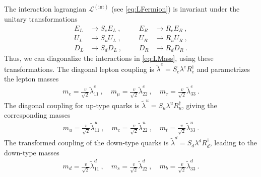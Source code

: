 The interaction lagrangian $\mathcal{L}^{(\text{int})}$ (see \eqref{eq:LFermion}) is invariant under the unitary transformations
\begin{align}
	E_L &\rightarrow S_eE_L \ , && &E_R &\rightarrow R_eE_R \ , \\
	U_L &\rightarrow S_uU_L \ , && &U_R &\rightarrow R_uU_R \ , \\
	D_L &\rightarrow S_dD_L \ , && &D_R &\rightarrow R_dD_R \ .
\end{align}
Thus, we can diagonalize the interactions in \eqref{eq:LMass}, using these transformations. The diagonal lepton coupling is $\tilde{\lambda}^e = S_e\lambda^eR_e^\dagger$ and parametrizes the lepton masses
\begin{align}
	m_e = \frac{v}{\sqrt{2}}\tilde{\lambda}_{11}^e \ , \quad m_\mu = \frac{v}{\sqrt{2}}\tilde{\lambda}_{22}^e \ , \quad m_\tau = \frac{v}{\sqrt{2}}\tilde{\lambda}_{33}^e \ .
\end{align}
The diagonal coupling for up-type quarks is $\tilde{\lambda}^u = S_u\lambda^uR_u^\dagger$, giving the corresponding masses
\begin{align}
	m_u = \frac{v}{\sqrt{2}}\tilde{\lambda}_{11}^u \ , \quad m_c = \frac{v}{\sqrt{2}}\tilde{\lambda}_{22}^u \ , \quad m_t = \frac{v}{\sqrt{2}}\tilde{\lambda}_{33}^u \ .
\end{align}
The transformed coupling of the down-type quarks is $\tilde{\lambda}^d = S_d\lambda^dR_d^\dagger$, leading to the down-type masses
\begin{align}
	m_d = \frac{v}{\sqrt{2}}\tilde{\lambda}_{11}^d \ , \quad m_s = \frac{v}{\sqrt{2}}\tilde{\lambda}_{22}^d \ , \quad m_b = \frac{v}{\sqrt{2}}\tilde{\lambda}_{33}^d \ .
\end{align}


